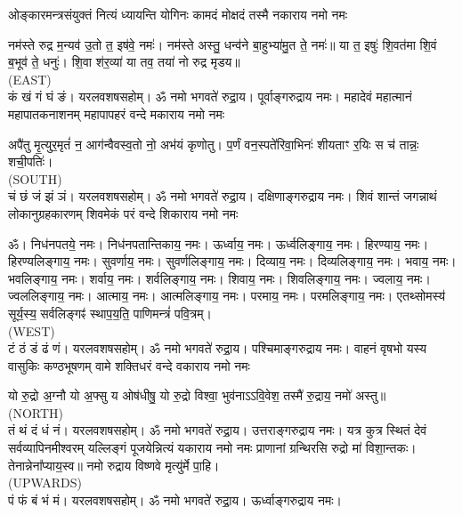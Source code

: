 



\twolineshloka
{ओङ्कारमन्त्रसंयुक्तं नित्यं ध्यायन्ति योगिनः}
{कामदं मोक्षदं तस्मै नकाराय नमो नमः}

नम॑स्ते रुद्र म॒न्यव॑ उ॒तो त॒ इष॑वे॒ नमः॑। नम॑स्ते अस्तु॒ धन्व॑ने बा॒हुभ्या॑मु॒त ते॒ नमः॑॥ या त॒ इषुः॑ शि॒वत॑मा शि॒वं ब॒भूव॑ ते॒ धनुः॑। शि॒वा श॑र॒व्या॑ या तव॒ तया॑ नो रुद्र मृडय॥\\
{\scriptsize (EAST)}\\
कं खं गं घं ङं। यरलवशषसहोम्। ॐ नमो भगवते॑ रुद्रा॒य। पूर्वाङ्गरुद्राय नमः। 
\medskip
\twolineshloka
{महादेवं महात्मानं महापातकनाशनम्}
{महापापहरं वन्दे मकाराय नमो नमः}

अपै॑तु मृ॒त्युर॒मृतं॑ न॒ आग॑न्वैवस्व॒तो नो॒ अभ॑यं कृणोतु।
प॒र्णं वन॒स्पते॑रिवा॒भिनः॑ शीयताꣳ र॒यिः स च॑ तान्नः॒ शची॒पतिः॑।\\
{\scriptsize (SOUTH)}\\
चं छं जं झं ञं। यरलवशषसहोम्। ॐ नमो भगवते॑ रुद्रा॒य। दक्षिणाङ्गरुद्राय नमः।
\medskip
\twolineshloka
{शिवं शान्तं जगन्नाथं लोकानुग्रहकारणम्}
{शिवमेकं परं वन्दे शिकाराय नमो नमः}

ॐ। निध॑नपतये॒ नमः। निध॑नपतान्तिकाय॒ नमः। ऊर्ध्वाय॒ नमः। ऊर्ध्वलिङ्गाय॒ नमः। हिरण्याय॒ नमः। हिरण्यलिङ्गाय॒ नमः। सुवर्णाय॒ नमः। सुवर्णलिङ्गाय॒ नमः। दिव्याय॒ नमः। दिव्यलिङ्गाय॒ नमः। भवाय॒ नमः। भवलिङ्गाय॒ नमः। शर्वाय॒ नमः। शर्वलिङ्गाय॒ नमः। शिवाय॒ नमः। शिवलिङ्गाय॒ नमः। ज्वलाय॒ नमः। ज्वललिङ्गाय॒ नमः। आत्माय॒ नमः। आत्मलिङ्गाय॒ नमः। परमाय॒ नमः। परमलिङ्गाय॒ नमः। एतथ्सोमस्य॑ सूर्य॒स्य॒ सर्वलिङ्गꣴ॑ स्थाप॒य॒ति॒ पाणिमन्त्रं॑ पवि॒त्रम्।\\
{\scriptsize (WEST)}\\
टं ठं डं ढं णं। यरलवशषसहोम्। ॐ नमो भगवते॑ रुद्रा॒य। पश्चिमाङ्गरुद्राय नमः।
\medskip
\twolineshloka
{वाहनं वृषभो यस्य वासुकिः कण्ठभूषणम्}
{वामे शक्तिधरं वन्दे वकाराय नमो नमः}

यो रु॒द्रो अ॒ग्नौ यो अ॒फ्सु य ओष॑धीषु॒ यो रु॒द्रो विश्वा॒ भुव॑नाऽऽवि॒वेश॒ तस्मै॑ रु॒द्राय॒ नमो॑ अस्तु॥ \\
{\scriptsize (NORTH)}\\
तं थं दं धं नं। यरलवशषसहोम्। ॐ नमो भगवते॑ रुद्रा॒य। उत्तराङ्गरुद्राय नमः।
\medskip
\twolineshloka
{यत्र कुत्र स्थितं देवं सर्वव्यापिनमीश्वरम्}
{यल्लिङ्गं पूजयेन्नित्यं यकाराय नमो नमः}
प्राणानां ग्रन्थिरसि रुद्रो मा॑ विशा॒न्तकः। तेनान्नेना᳚प्याय॒स्व॥ नमो रुद्राय विष्णवे मृत्यु॑र्मे पा॒हि।\\
{\scriptsize (UPWARDS)}\\
पं फं बं भं मं। यरलवशषसहोम्। ॐ नमो भगवते॑ रुद्रा॒य। ऊर्ध्वाङ्गरुद्राय नमः।

